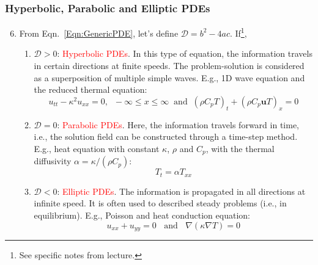 \documentclass[10pt,compress]{beamer}
\begin{document}
\begin{frame}
 \frametitle{Hyperbolic, Parabolic and Elliptic PDEs} 
 \begin{enumerate}
   \setcounter{enumi}{5}
   \item <1-> From Eqn.~\ref{Eqn:GenericPDE}, let's define $\mathcal{D}=b^{2}-4ac$. If\footnote{See specific notes from lecture.},
     \begin{enumerate}
        \item <2-> $\mathcal{D}>0$: \textcolor{red}{Hyperbolic PDEs}. In this type of equation, the information travels in certain directions at finite speeds. The problem-solution is considered as a superposition of multiple simple waves. E.g., 1D wave equation and the reduced thermal equation:
          \begin{displaymath}
            u_{tt}-\kappa^{2}u_{xx} = 0, \;\; -\infty\leq x\leq \infty \;\;\text{and}\;\; \left(\rho C_{p}T\right)_{t} + \left(\rho C_{p}\bm{u}T\right)_{x}=0
          \end{displaymath} 
        \item <3-> $\mathcal{D}=0$: \textcolor{red}{Parabolic PDEs}. Here, the information travels forward in time, i.e., the solution field can be constructed through a time-step method. E.g., heat equation with constant $\kappa$, $\rho$ and $C_{p}$, with the thermal diffusivity $\alpha=\kappa/\left(\rho C_{p}\right)$:
          \begin{displaymath}
             T_{t} = \alpha T_{xx}
          \end{displaymath}
        \item <4-> $\mathcal{D}<0$: \textcolor{red}{Elliptic PDEs}. The information is propagated in all directions at infinite speed. It is often used to described steady problems (i.e., in equilibrium). E.g., Poisson and heat conduction equation:
          \begin{displaymath}
             u_{xx} +u_{yy} = 0 \;\;\text{ and } \;\; \nabla\left(\kappa\nabla T\right) = 0
          \end{displaymath}
      \end{enumerate}
\end{enumerate}   
 
\end{frame}
\end{document}

